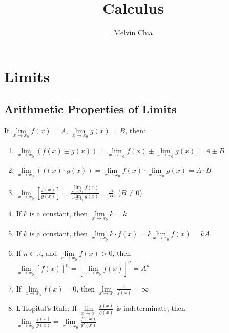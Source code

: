 \documentclass{report}
\title{Calculus}
\author{Melvin Chia}
\begin{document}
\maketitle
\tableofcontents

\chapter{Limits}

\section{Arithmetic Properties of Limits}

\begin{mdframed}[style=MyFrame]
      If $\lim\limits_{x \to x_0} f(x) = A$, $\lim\limits_{x \to x_0} g(x) = B$, then:
      \begin{enumerate}[label= (\alph*)]
            \item $\lim\limits_{x \to x_0} (f(x) \pm g(x)) = \lim\limits_{x \to x_0} f(x) \pm \lim\limits_{x \to x_0} g(x) = A \pm B$
            \item $\lim\limits_{x \to x_0} (f(x) \cdot g(x)) = \lim\limits_{x \to x_0} f(x) \cdot \lim\limits_{x \to x_0} g(x) = A \cdot B$
            \item $\lim\limits_{x \to x_0} \left[\frac{f(x)}{g(x)}\right] = \frac{\lim\limits_{x \to x_0} f(x)}{\lim\limits_{x \to x_0} g(x)} = \frac{A}{B}$, ($B \neq 0$)
            \item If $k$ is a constant, then $\lim\limits_{x \to x_0} k = k$
            \item If $k$ is a constant, then $\lim\limits_{x \to x_0} k \cdot f(x) = k
                        \lim\limits_{x \to x_0} f(x) = kA$
            \item If $n \in \mathbb{R}$, and $\lim\limits_{x \to x_0} f(x) > 0$, then
                  $\lim\limits_{x \to x_0} {[f(x)]}^n = {\left[\lim\limits_{x \to
                                    x_0}f(x)\right]}^n = A^n$
            \item If $\lim\limits_{x \to x_0} f(x) = 0$, then $\lim\limits_{x \to x_0}
                        \frac{1}{f(x)} = \infty$
            \item L'Hopital's Rule: If $\lim\limits_{x \to x_0} \frac{f(x)}{g(x)}$ is
                  indeterminate, then $\lim\limits_{x \to x_0} \frac{f(x)}{g(x)} = \lim\limits_{x
                              \to x_0} \frac{f'(x)}{g'(x)}$
      \end{enumerate}
\end{mdframed}
\end{document}

